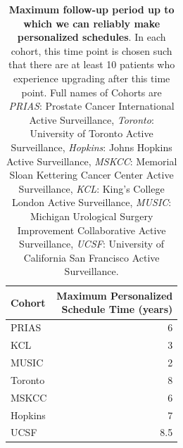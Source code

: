 \begin{table}[!htb]
\small\sf\centering
\caption{\textbf{Maximum follow-up period up to which we can reliably make personalized schedules}. In each cohort, this time point is chosen such that there are at least 10 patients who experience upgrading after this time point. Full names of Cohorts are \textit{PRIAS}: Prostate Cancer International Active Surveillance, \textit{Toronto}: University of Toronto Active Surveillance, \textit{Hopkins}: Johns Hopkins Active Surveillance, \textit{MSKCC}: Memorial Sloan Kettering Cancer Center Active Surveillance, \textit{KCL}: King's College London Active Surveillance, \textit{MUSIC}: Michigan Urological Surgery Improvement Collaborative Active Surveillance, \textit{UCSF}: University of California San Francisco Active Surveillance.}
\label{tab:max_pred_time_repeat}
\begin{tabular}{l|r}
\hline
\hline
Cohort & \parbox[t]{3.75cm}{Maximum Personalized\\Schedule Time (years)}\\
\hline
PRIAS & 6\\
KCL & 3\\
MUSIC & 2\\
Toronto & 8\\
MSKCC & 6\\
Hopkins & 7\\
UCSF & 8.5\\
\hline
\end{tabular}	
\end{table}

